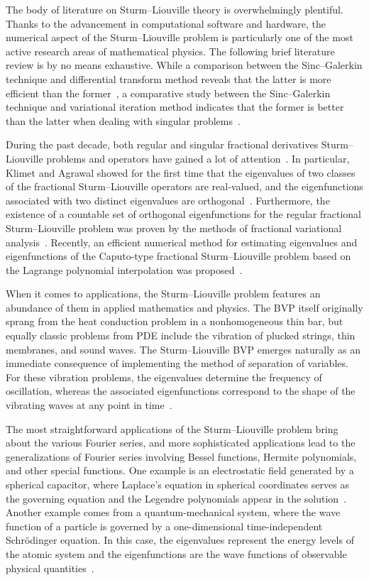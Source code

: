 \documentclass[symmetry,article,accept,moreauthors,pdftex,a4paper]{mdpi}
\begin{document}
The body of literature on Sturm--Liouville theory is overwhelmingly plentiful. Thanks to the advancement in computational software and hardware, the numerical aspect of the Sturm--Liouville problem is particularly one of the most active research areas of mathematical physics. The following brief literature review is by no means exhaustive. While a comparison between the Sinc--Galerkin technique and differential transform method reveals that the latter is more efficient than the former~\cite{alquran2010approximations}, a comparative study between the Sinc--Galerkin technique and variational iteration method indicates that the former is better than the latter when dealing with singular problems~\cite{alkhaled2020comparison}.

During the past decade, both regular and singular fractional derivatives Sturm--Liouville problems and operators have gained a lot of attention~\cite{almdallal2009efficient,klimet2013fractional,zayernouri2013fractional}. In particular, Klimet and Agrawal showed for the first time that the eigenvalues of two classes of the fractional Sturm--Liouville operators are real-valued, and the eigenfunctions associated with two distinct eigenvalues are orthogonal~\cite{klimet2013fractional}. Furthermore, the existence of a countable set of orthogonal eigenfunctions for the regular fractional Sturm--Liouville problem was proven by the methods of fractional variational analysis~\cite{klimek2014variational}. Recently, an efficient numerical method for estimating eigenvalues and eigenfunctions of the Caputo-type fractional Sturm--Liouville problem based on the Lagrange polynomial interpolation was proposed~\cite{sadabad2021efficient}.
	
When it comes to applications, the Sturm--Liouville problem features an abundance of them in applied mathematics and physics. The BVP itself originally sprang from the heat conduction problem in a nonhomogeneous thin bar, but equally classic problems from PDE include the vibration of plucked strings, thin membranes, and sound waves. The Sturm--Liouville BVP emerges naturally as an immediate consequence of implementing the method of separation of variables. For these vibration problems, the eigenvalues determine the frequency of oscillation, whereas the associated eigenfunctions correspond to the shape of the vibrating waves at any point in time~\cite{luetzen1990joseph}.

The most straightforward applications of the Sturm--Liouville problem bring about the various Fourier series, and more sophisticated applications lead to the generalizations of Fourier series involving Bessel functions, Hermite polynomials, and other special functions. One example is an electrostatic field generated by a spherical capacitor, where Laplace's equation in spherical coordinates serves as the governing equation and the Legendre polynomials appear in the solution~\cite{gwaiz2008sturm}. Another example comes from a quantum-mechanical system, where the wave function of a particle is governed by a one-dimensional time-independent Schr\"odinger equation. In this case, the eigenvalues represent the energy levels of the atomic system and the eigenfunctions are the wave functions of observable physical quantities~\cite{band2013quantum,griffiths2018introduction}.
\end{document}
